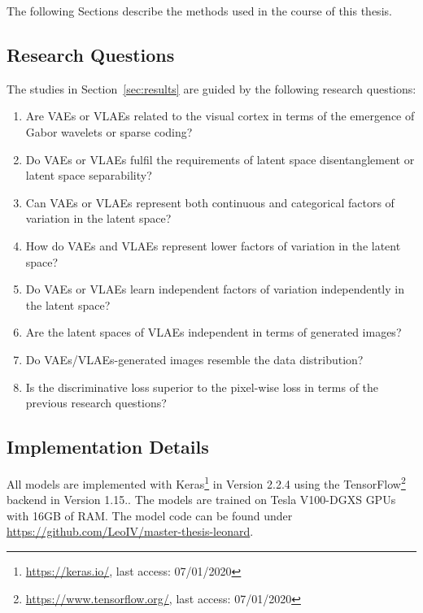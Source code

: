 The following Sections describe the methods used in the course of this thesis.

\subsection{Research Questions}\label{subsec:research-questions}

The studies in Section~\ref{sec:results} are guided by the following research questions:
\begin{enumerate}
    \item Are \acp{VAE} or \acp{VLAE} related to the visual cortex in terms of the emergence of Gabor wavelets or sparse coding?
    \item Do \acp{VAE} or \acp{VLAE} fulfil the requirements of latent space disentanglement or latent space separability?
    \item Can \acp{VAE} or \acp{VLAE} represent both continuous and categorical factors of variation in the latent space?
    \item How do \acp{VAE} and \acp{VLAE} represent lower factors of variation in the latent space?
    \item Do \acp{VAE} or \acp{VLAE} learn independent factors of variation independently in the latent space?
    \item Are the latent spaces of \acp{VLAE} independent in terms of generated images?
    \item Do \acp{VAE}/\acp{VLAE}-generated images resemble the data distribution?
    \item Is the discriminative loss superior to the pixel-wise loss in terms of the previous research questions?
\end{enumerate}

\subsection{Implementation Details}\label{subsec:implementation-details}

All models are implemented with Keras\footnote{\href{https://keras.io/}{https://keras.io/}, last access: 07/01/2020} in Version 2.2.4 using the TensorFlow\footnote{\href{https://www.tensorflow.org/}{https://www.tensorflow.org/}, last access: 07/01/2020} backend in Version 1.15..
The models are trained on Tesla V100-DGXS GPUs with 16GB of RAM.
The model code can be found under \href{https://github.com/LeoIV/master-thesis-leonard}{https://github.com/LeoIV/master-thesis-leonard}.

